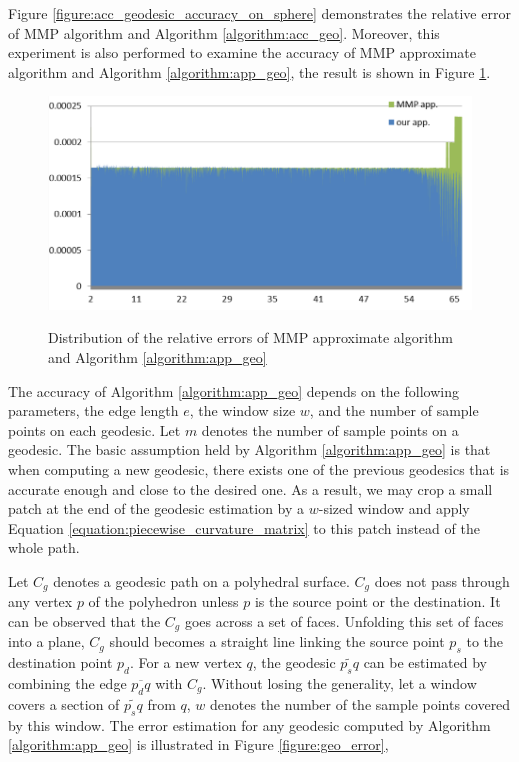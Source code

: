 Figure \ref{figure:acc_geodesic_accuracy_on_sphere} demonstrates the relative error of MMP algorithm and Algorithm \ref{algorithm:acc_geo}. Moreover, this experiment is also performed to examine the accuracy of MMP approximate algorithm and Algorithm \ref{algorithm:app_geo}, the result is shown in Figure \ref{figure:app_geodesic_accuracy_on_sphere}.

\begin{figure}[H]
	\centering
	\includegraphics[width=0.8\columnwidth]{../images/geodesic_image/accuracy_1}\\
    \caption{Distribution of the relative errors of MMP approximate algorithm and Algorithm \ref{algorithm:app_geo}}
    \label{figure:app_geodesic_accuracy_on_sphere}
\end{figure}  

The accuracy of Algorithm \ref{algorithm:app_geo} depends on the following parameters, the edge length $e$, the window size $w$, and the number of sample points on each geodesic. Let $m$ denotes the number of sample points on a geodesic. The basic assumption held by Algorithm \ref{algorithm:app_geo} is that when computing a new geodesic, there exists one of the previous geodesics that is accurate enough and close to the desired one. As a result, we may crop a small patch at the end of the geodesic estimation by a $w$-sized window and apply Equation \ref{equation:piecewise_curvature_matrix} to this patch instead of the whole path. 

Let $C_{g}$ denotes a geodesic path on a polyhedral surface.  $C_{g}$ does not pass through any vertex $p$ of the polyhedron unless $p$ is the source point or the destination. It can be observed that the $C_{g}$ goes across a set of faces. Unfolding this set of faces into a plane, $C_{g}$ should becomes a straight line linking the source point $p_{s}$ to the destination point $p_{d}$. For a new vertex $q$, the geodesic $\widetilde{p_{s}q}$ can be estimated by combining the edge $\overline{p_{d}q}$ with $C_{g}$. Without losing the generality, let a window covers a section of $\widetilde{p_{s}q}$ from $q$, $w$ denotes the number of the sample points covered by this window. The error estimation for any geodesic computed by Algorithm \ref{algorithm:app_geo} is illustrated in Figure \ref{figure:geo_error},

